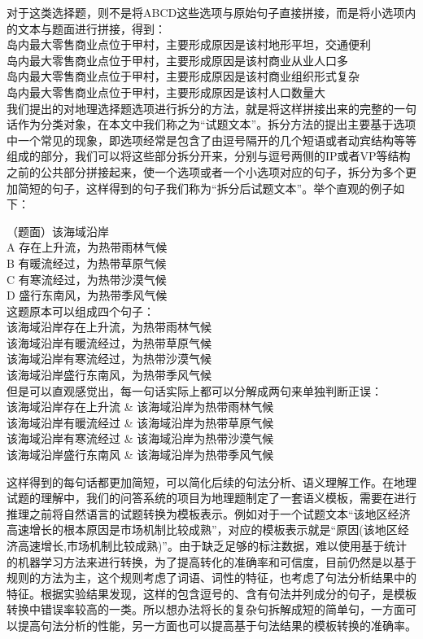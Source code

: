 \documentclass[master, winfont]{njuthesis}
\begin{document}
对于这类选择题，则不是将ABCD这些选项与原始句子直接拼接，而是将小选项内的文本与题面进行拼接，得到：\\
岛内最大零售商业点位于甲村，主要形成原因是该村地形平坦，交通便利\\
岛内最大零售商业点位于甲村，主要形成原因是该村商业从业人口多\\
岛内最大零售商业点位于甲村，主要形成原因是该村商业组织形式复杂\\
岛内最大零售商业点位于甲村，主要形成原因是该村人口数量大\\

我们提出的对地理选择题选项进行拆分的方法，就是将这样拼接出来的完整的一句话作为分类对象，在本文中我们称之为“试题文本”。拆分方法的提出主要基于选项中一个常见的现象，即选项经常是包含了由逗号隔开的几个短语或者动宾结构等等组成的部分，我们可以将这些部分拆分开来，分别与逗号两侧的IP或者VP等结构之前的公共部分拼接起来，使一个选项或者一个小选项对应的句子，拆分为多个更加简短的句子，这样得到的句子我们称为“拆分后试题文本”。举个直观的例子如下：

（题面）该海域沿岸\\
A 存在上升流，为热带雨林气候\\
B 有暖流经过，为热带草原气候\\
C 有寒流经过，为热带沙漠气候\\
D 盛行东南风，为热带季风气候\\

这题原本可以组成四个句子：\\
该海域沿岸存在上升流，为热带雨林气候\\
该海域沿岸有暖流经过，为热带草原气候\\
该海域沿岸有寒流经过，为热带沙漠气候\\
该海域沿岸盛行东南风，为热带季风气候\\

但是可以直观感觉出，每一句话实际上都可以分解成两句来单独判断正误：\\
该海域沿岸存在上升流 \& 该海域沿岸为热带雨林气候\\
该海域沿岸有暖流经过 \& 该海域沿岸为热带草原气候\\
该海域沿岸有寒流经过 \& 该海域沿岸为热带沙漠气候\\
该海域沿岸盛行东南风 \& 该海域沿岸为热带季风气候

这样得到的每句话都更加简短，可以简化后续的句法分析、语义理解工作。在地理试题的理解中，我们的问答系统的项目为地理题制定了一套语义模板，需要在进行推理之前将自然语言的试题转换为模板表示。例如对于一个试题文本“该地区经济高速增长的根本原因是市场机制比较成熟”，对应的模板表示就是“原因(该地区经济高速增长,市场机制比较成熟)”。由于缺乏足够的标注数据，难以使用基于统计的机器学习方法来进行转换，为了提高转化的准确率和可信度，目前仍然是以基于规则的方法为主，这个规则考虑了词语、词性的特征，也考虑了句法分析结果中的特征。根据实验结果发现，这样的包含逗号的、含有句法并列成分的句子，是模板转换中错误率较高的一类。所以想办法将长的复杂句拆解成短的简单句，一方面可以提高句法分析的性能，另一方面也可以提高基于句法结果的模板转换的准确率。
\end{document}
